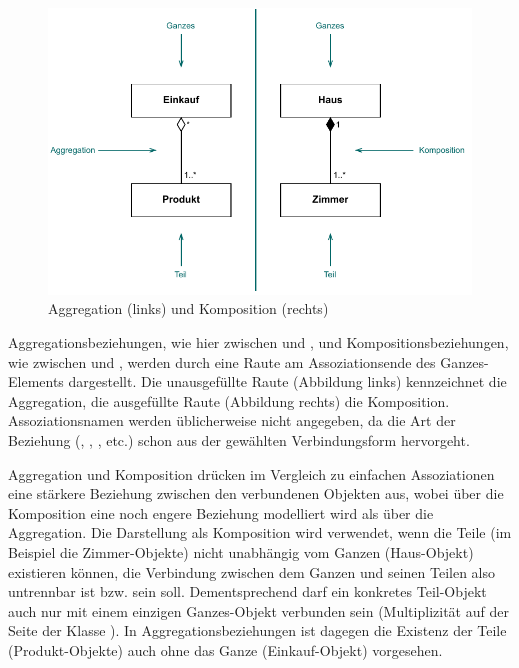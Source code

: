 \begin{figure}[h!]
	\centering
	\includegraphics{Bilder/Kapitel-4/aggregation_vs_komposition.pdf}
	\caption[Aggregation und Komposition]{Aggregation (links) und Komposition (rechts)}
	\label{fig:aggregation_und_komposition}
\end{figure}

Aggregationsbeziehungen, wie hier zwischen  und , und Komposi\-tions\-beziehungen, wie zwischen  und , werden durch eine Raute am Assoziationsende des Ganzes-Elements dargestellt. Die unausgefüllte Raute (Abbildung links) kennzeichnet die Aggregation, die ausgefüllte Raute (Abbildung rechts) die Komposition. Assoziationsnamen werden üblicherweise nicht angegeben, da die Art der Beziehung (, , ,
   etc.) schon aus der gewählten Verbindungsform hervorgeht.

Aggregation und Komposition drücken im Vergleich zu einfachen Assoziationen eine stärkere Beziehung zwischen den verbundenen Objekten aus, wobei über die Komposition eine noch engere Beziehung modelliert wird als über die Aggrega\-tion. Die Darstellung als Komposition wird verwendet, wenn die Teile (im Beispiel die Zimmer-Objekte) nicht unabhängig vom Ganzen (Haus-Objekt) existieren können, die Verbindung zwischen dem Ganzen und seinen Teilen also untrennbar ist bzw. sein soll. Dementsprechend darf ein konkretes Teil-Objekt auch nur mit einem einzigen Ganzes-Objekt verbunden sein (Multiplizität  auf der Seite der Klasse ). In Aggregationsbeziehungen ist dagegen die Existenz der Teile (Produkt-Objekte) auch ohne das Ganze (Einkauf-Objekt) vorgesehen.

